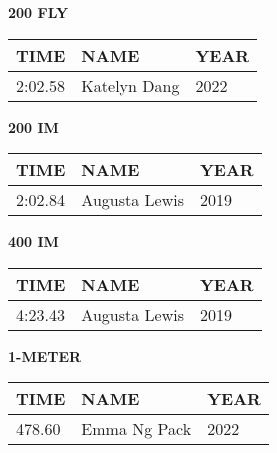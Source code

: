 \begin{minipage}[t]{0.48\textwidth}
\centering
\textbf{200 FLY}\\[0.05cm]
\begin{tabular}{@{}p{1.8cm}p{2.8cm}p{1.2cm}@{}}
\hline
\textbf{TIME} & \textbf{NAME} & \textbf{YEAR} \\
\hline
2:02.58 & Katelyn Dang & 2022 \\
\hline
\end{tabular}
\end{minipage}\hfill
\begin{minipage}[t]{0.48\textwidth}
\centering
\textbf{200 IM}\\[0.05cm]
\begin{tabular}{@{}p{1.8cm}p{2.8cm}p{1.2cm}@{}}
\hline
\textbf{TIME} & \textbf{NAME} & \textbf{YEAR} \\
\hline
2:02.84 & Augusta Lewis & 2019 \\
\hline
\end{tabular}
\end{minipage}

\vspace{0.4cm}

\begin{center}
\begin{minipage}[t]{0.7\textwidth}
\centering
\textbf{400 IM}\\[0.05cm]
\begin{tabular}{@{}p{1.8cm}p{2.8cm}p{1.2cm}@{}}
\hline
\textbf{TIME} & \textbf{NAME} & \textbf{YEAR} \\
\hline
4:23.43 & Augusta Lewis & 2019 \\
\hline
\end{tabular}
\end{minipage}
\end{center}

\vspace{0.4cm}

\begin{center}
\begin{minipage}[t]{0.7\textwidth}
\centering
\textbf{1-METER}\\[0.05cm]
\begin{tabular}{@{}p{1.8cm}p{2.8cm}p{1.2cm}@{}}
\hline
\textbf{TIME} & \textbf{NAME} & \textbf{YEAR} \\
\hline
478.60 & Emma Ng Pack & 2022 \\
\hline
\end{tabular}
\end{minipage}
\end{center}

